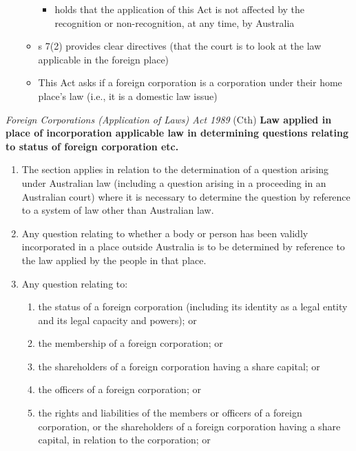 \begin{itemize}
\begin{itemize}
\begin{itemize}
            \item {} holds that the application of this Act is not affected by the recognition or non-recognition, at any time, by Australia
        \end{itemize}
        \item s 7(2) provides clear directives (that the court is to look at the law applicable in the foreign place)
        \item This Act asks if a foreign corporation is a corporation under their home place's law (i.e., it is a domestic law issue)
    \end{itemize}
\end{itemize}

\begin{statutedetails}{\textit{Foreign Corporations (Application of Laws) Act 1989} (Cth)}
    \flushleft
    \textbf{Law applied in place of incorporation applicable law in determining questions relating to status of foreign corporation etc.}
    \begin{enumerate}[label=(\arabic*)]
        \item The section applies in relation to the determination of a question arising under Australian law (including a question arising in a proceeding in an Australian court) where it is necessary to determine the question by reference to a system of law other than Australian law.
        \item Any question relating to whether a body or person has been validly incorporated in a place outside Australia is to be determined by reference to the law applied by the people in that place.
        \item Any question relating to:
        \begin{enumerate}[label=(\alph*)]
            \item the status of a foreign corporation (including its identity as a legal entity and its legal capacity and powers); or
            \item the membership of a foreign corporation; or
            \item the shareholders of a foreign corporation having a share capital; or
            \item the officers of a foreign corporation; or
            \item the rights and liabilities of the members or officers of a foreign corporation, or the shareholders of a foreign corporation having a share capital, in relation to the corporation; or

\end{enumerate}
\end{enumerate}
\end{statutedetails}
